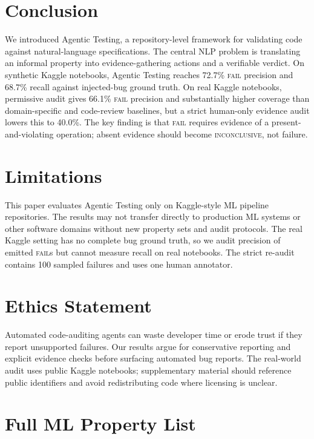 \documentclass[11pt]{article}
\begin{document}
\section{Conclusion}

We introduced Agentic Testing, a repository-level framework for validating code against natural-language specifications.
The central NLP problem is translating an informal property into evidence-gathering actions and a verifiable verdict.
On synthetic Kaggle notebooks, Agentic Testing reaches 72.7\% \textsc{fail} precision and 68.7\% recall against injected-bug ground truth.
On real Kaggle notebooks, permissive audit gives 66.1\% \textsc{fail} precision and substantially higher coverage than domain-specific and code-review baselines, but a strict human-only evidence audit lowers this to 40.0\%.
The key finding is that \textsc{fail} requires evidence of a present-and-violating operation; absent evidence should become \textsc{inconclusive}, not failure.

\section*{Limitations}

This paper evaluates Agentic Testing only on Kaggle-style ML pipeline repositories.
The results may not transfer directly to production ML systems or other software domains without new property sets and audit protocols.
The real Kaggle setting has no complete bug ground truth, so we audit precision of emitted \textsc{fail}s but cannot measure recall on real notebooks.
The strict re-audit contains 100 sampled failures and uses one human annotator.

\section*{Ethics Statement}

Automated code-auditing agents can waste developer time or erode trust if they report unsupported failures.
Our results argue for conservative reporting and explicit evidence checks before surfacing automated bug reports.
The real-world audit uses public Kaggle notebooks; supplementary material should reference public identifiers and avoid redistributing code where licensing is unclear.




\appendix
\section{Full ML Property List}
\label{app:properties}
\end{document}
